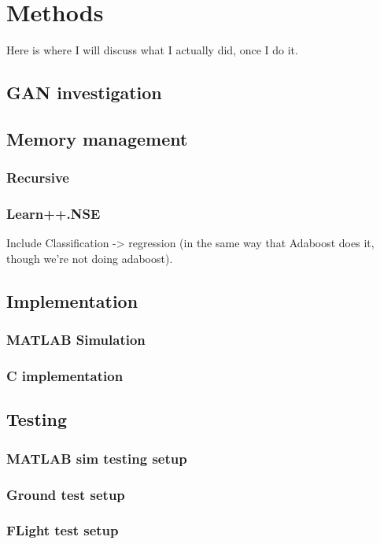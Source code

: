 \chapter{Methods}

\par Here is where I will discuss what I actually did, once I do it.
\section{GAN investigation}
\section{Memory management}
\subsection{Recursive}
\subsection{Learn++.NSE}
 Include Classification -> regression (in the same way that Adaboost does it, though we're not doing adaboost).
 
\section{Implementation}
\subsection{MATLAB Simulation}
\subsection{C implementation}

\section{Testing}
\subsection{MATLAB sim testing setup}
\subsection{ Ground test setup}
\subsection{FLight test setup}

